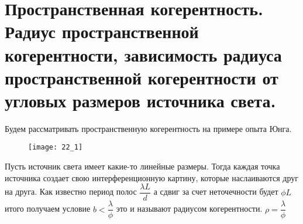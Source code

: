 
	\section{Пространственная когерентность. Радиус пространственной когерентности,
		зависимость радиуса пространственной когерентности от угловых размеров
		источника света.}
	Будем рассматривать пространственную когерентность на примере опыта Юнга. \\
	 \begin{figure}[H]
	 	\texttt{[image: 22\_1]}
	 \end{figure}
	 Пусть источник света имеет какие-то линейные размеры. Тогда каждая точка источника создает свою интерференционную картину, которые наслаиваются друг на друга. Как известно период полос $\dfrac{\lambda L}{d}$ а сдвиг за счет неточечности будет $\phi L$ итого получаем условие $b < \dfrac{\lambda}{\phi}$ это и называют радиусом когерентности. $ \rho = \dfrac{\lambda}{\phi}$
